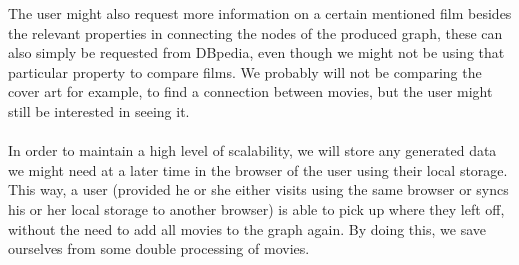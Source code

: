 The user might also request more information on a certain mentioned film besides the relevant properties in connecting the nodes of the produced graph, these can also simply be requested from DBpedia, even though we might not be using that particular property to compare films. We probably will not be comparing the cover art for example, to find a connection between movies, but the user might still be interested in seeing it.

\paragraph{}
In order to maintain a high level of scalability, we will store any generated
data we might need at a later time in the browser of the user using their local
storage.
This way, a user (provided he or she either visits using the same browser or
syncs his or her local storage to another browser) is able to pick up where they
left off, without the need to add all movies to the graph again.
By doing this, we save ourselves from some double processing of movies.
